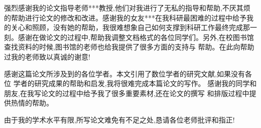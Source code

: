 
\begin{thanks}

强烈感谢我的论文指导老师***教授,他们对我进行了无私的指导和帮助,不厌其烦的帮助进行论文的修改和改进。感谢我的女友***在我科研最困难的过程中给予我的关心和照顾，没有她的帮助，我很难想象自己如何支撑到科研工作最终完成那一刻。感谢在做论文的过程中,帮助我调整文档格式的各位同学们。另外,在校图书馆查找资料的时候,图书馆的老师也给我提供了很多方面的支持与 帮助。在此向帮助过我的老师致以真诚的谢意!



感谢这篇论文所涉及到的各位学者。本文引用了数位学者的研究文献,如果没有各位 学者的研究成果的帮助和启发,我将很难完成本篇论文的写作。
感谢我的同学和朋友,在我写论文的过程中给予我了很多重要素材,还在论文的撰写 和排版过程中提供热情的帮助。

  由于我的学术水平有限,所写论文难免有不足之处,恳请各位老师批评和指正!

\end{thanks}
